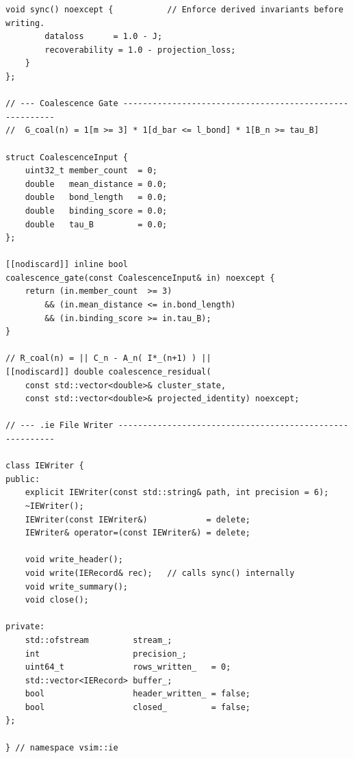 \documentclass[11pt,a4paper]{article}
\begin{document}
\begin{lstlisting}[style=cppstyle]
    void sync() noexcept {           // Enforce derived invariants before writing.
        dataloss      = 1.0 - J;
        recoverability = 1.0 - projection_loss;
    }
};

// --- Coalescence Gate --------------------------------------------------------
//  G_coal(n) = 1[m >= 3] * 1[d_bar <= l_bond] * 1[B_n >= tau_B]

struct CoalescenceInput {
    uint32_t member_count  = 0;
    double   mean_distance = 0.0;
    double   bond_length   = 0.0;
    double   binding_score = 0.0;
    double   tau_B         = 0.0;
};

[[nodiscard]] inline bool
coalescence_gate(const CoalescenceInput& in) noexcept {
    return (in.member_count  >= 3)
        && (in.mean_distance <= in.bond_length)
        && (in.binding_score >= in.tau_B);
}

// R_coal(n) = || C_n - A_n( I*_(n+1) ) ||
[[nodiscard]] double coalescence_residual(
    const std::vector<double>& cluster_state,
    const std::vector<double>& projected_identity) noexcept;

// --- .ie File Writer ---------------------------------------------------------

class IEWriter {
public:
    explicit IEWriter(const std::string& path, int precision = 6);
    ~IEWriter();
    IEWriter(const IEWriter&)            = delete;
    IEWriter& operator=(const IEWriter&) = delete;

    void write_header();
    void write(IERecord& rec);   // calls sync() internally
    void write_summary();
    void close();

private:
    std::ofstream         stream_;
    int                   precision_;
    uint64_t              rows_written_   = 0;
    std::vector<IERecord> buffer_;
    bool                  header_written_ = false;
    bool                  closed_         = false;
};

} // namespace vsim::ie
\end{lstlisting}
\end{document}
